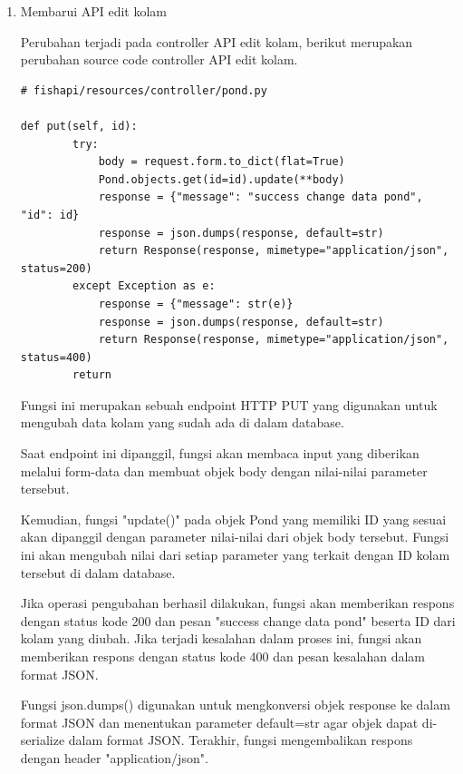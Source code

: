 \begin{enumerate}[1.]
response json:

\begin{lstlisting}
{
  "message": "success add pond",
  "id": "62aa118fa95cbcb494c5a4a6"
}\end{lstlisting}

\item Membarui API edit kolam

Perubahan terjadi pada controller API edit kolam, berikut merupakan perubahan source code controller API edit kolam.

\begin{lstlisting}
# fishapi/resources/controller/pond.py

def put(self, id):
        try:
            body = request.form.to_dict(flat=True)
            Pond.objects.get(id=id).update(**body)
            response = {"message": "success change data pond", "id": id}
            response = json.dumps(response, default=str)
            return Response(response, mimetype="application/json", status=200)
        except Exception as e:
            response = {"message": str(e)}
            response = json.dumps(response, default=str)
            return Response(response, mimetype="application/json", status=400)
        return
\end{lstlisting}

Fungsi ini merupakan sebuah endpoint HTTP PUT yang digunakan untuk mengubah data kolam yang sudah ada di dalam database.

Saat endpoint ini dipanggil, fungsi akan membaca input yang diberikan melalui form-data dan membuat objek body dengan nilai-nilai parameter tersebut.

Kemudian, fungsi "update()" pada objek Pond yang memiliki ID yang sesuai akan dipanggil dengan parameter nilai-nilai dari objek body tersebut. Fungsi ini akan mengubah nilai dari setiap parameter yang terkait dengan ID kolam tersebut di dalam database.

Jika operasi pengubahan berhasil dilakukan, fungsi akan memberikan respons dengan status kode 200 dan pesan "success change data pond" beserta ID dari kolam yang diubah. Jika terjadi kesalahan dalam proses ini, fungsi akan memberikan respons dengan status kode 400 dan pesan kesalahan dalam format JSON.

Fungsi json.dumps() digunakan untuk mengkonversi objek response ke dalam format JSON dan menentukan parameter default=str agar objek dapat di-serialize dalam format JSON. Terakhir, fungsi mengembalikan respons dengan header "application/json".


\end{enumerate}
